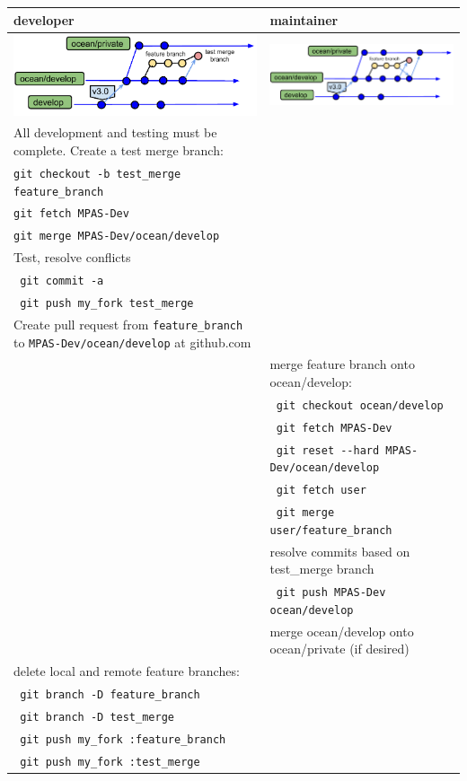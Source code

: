 \documentclass[11pt]{article}
\begin{document}
\begin{enumerate}
\begin{centering}
\end{centering}
 \begin{tabular}[c]{L{3.3in}|L{3.3in}}
developer & maintainer \\
\hline
\includegraphics[width=3.25in]{f/MPASworkflow_3d.pdf} & \includegraphics[width=3.25in]{f/MPASworkflow_3.pdf} \\
All development and testing must be complete.
Create a test merge branch: \\
\verb|git checkout -b test_merge feature_branch|  \\
\verb|git fetch MPAS-Dev| \\
\verb|git merge MPAS-Dev/ocean/develop|  \\
Test, resolve conflicts \\
\verb| git commit -a|  \\
\verb| git push my_fork test_merge| \\
Create pull request from \verb|feature_branch| to \verb|MPAS-Dev/ocean/develop| at github.com \\
& merge feature branch onto ocean/develop: \\
& \verb| git checkout ocean/develop| \\
& \verb| git fetch MPAS-Dev| \\
& \verb| git reset --hard MPAS-Dev/ocean/develop | \\
& \verb| git fetch user| \\
& \verb| git merge user/feature_branch| \\
& resolve commits based on test\_merge branch \\
& \verb| git push MPAS-Dev ocean/develop| \\
& merge ocean/develop onto ocean/private (if desired)\\
delete local and remote feature branches: \\
\verb| git branch -D feature_branch|  \\
\verb| git branch -D test_merge|  \\
\verb| git push my_fork :feature_branch| \\
\verb| git push my_fork :test_merge| \\
 \end{tabular}


\end{enumerate}
\end{document}
